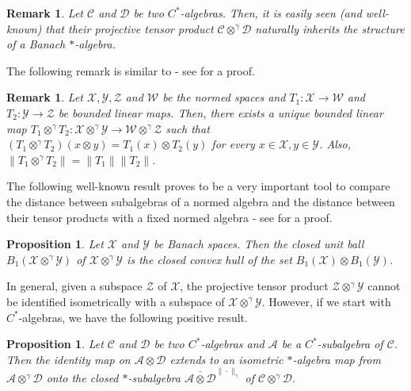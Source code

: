 \documentclass{amsart}
\numberwithin{equation}{section}
\newcommand{\mcal}{\mathcal}
\newcommand{\1}{\mathbf{1}}
\newcommand{\mA}{\mathcal{A}}
\newcommand{\mC}{\mathcal{C}}
\newcommand{\mD}{\mathcal{D}}
\newtheorem{proposition}[theorem]{Proposition}
\newtheorem{remark}[theorem]{Remark}
\begin{document}
\begin{remark}
  Let $\mC$ and $\mD$ be two $C^*$-algebras. Then, it is easily seen (and well-known) that their projective
  tensor product $\mC \otimes^{\gamma}\mD$ naturally inherits the
  structure of a Banach $*$-algebra.  
\end{remark}

The following remark is similar to  - see
\cite[Proposition 2.3]{R} for a proof.
\begin{remark}\label{P bounded maps}
Let $\mcal{X},\mcal{Y},\mcal{Z}$ and $\mcal{W}$ be the normed spaces
and $T_{1}:\mcal{X}\rightarrow \mcal{W} $ and $T_{2}:
\mcal{Y}\rightarrow \mcal{Z}$ be bounded linear maps. Then, there
exists a unique bounded linear map $T_{1}\otimes^{\gamma} T_{2}:
\mcal{X} \otimes^{\gamma} \mcal{Y} \rightarrow \mcal{W}
\otimes^{\gamma} \mcal{Z} $ such that $(T_{1}\otimes^{\gamma}
T_{2})(x\otimes y)= T_{1}(x)\otimes T_{2}(y)$ for every $x\in
\mcal{X}, y\in \mcal{Y}$. Also, $\|T_{1}\otimes^{\gamma} T_{2}\|=
\|T_{1}\|\|T_{2}\|$.
\end{remark}

The following well-known result proves to be a very important tool to
compare the distance between subalgebras of a normed algebra and the
distance between their tensor products with a fixed normed algebra -
see \cite[Proposition 2.2]{R} for a proof.
\begin{proposition}{\label{unit-ball}}
Let $\mcal{X}$ and $\mcal{Y}$ be Banach spaces.  Then the closed unit
ball $B_{1}(\mcal{X} \otimes^{\gamma} \mcal{Y})$ of $\mcal{X}
\otimes^{\gamma} \mcal{Y}$ is the closed convex hull of the set
$B_{1}(\mcal{X})\otimes B_{1}(\mcal{Y})$.
\end{proposition}

In general, given a subspace $\mcal{Z}$ of $\mcal{X}$, the projective
tensor product $\mathcal{Z} \otimes^{\gamma} \mathcal{Y}$ cannot be
identified isometrically with a subspace of $\mathcal{X}
\otimes^{\gamma} \mathcal{Y}$.  However, if we start with
$C^*$-algebras, we have the following positive result.

\begin{proposition}\cite[Theorem 2.6]{GR}\label{injectivity}
Let $\mC$ and $\mD$ be two $C^*$-algebras and $\mA$ be a
$C^*$-subalgebra of $\mC$. Then the identity map on $\mA \otimes \mD$
extends to an isometric $*$-algebra map from $\mA \otimes^{\gamma}\mD$
onto the closed $*$-subalgebra $\overline{\mA \otimes
  \mD}^{\|\cdot\|_{\gamma}}$ of $\mC\otimes^{\gamma} \mD$.
\end{proposition}
\end{document}
